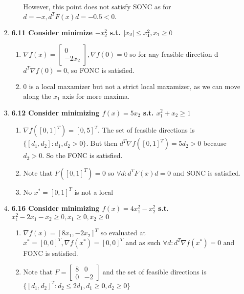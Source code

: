 \documentclass[10pt,a4paper]{article}
\DeclarePairedDelimiter{\abs}{\lvert}{\rvert}
\begin{document}
\begin{enumerate}
\begin{enumerate}
        However, this point does not satisfy SONC as for $d = -x, d^TF(x)d = -0.5 < 0$.
    \end{enumerate}

    \item \textbf{6.11 Consider minimize $-x_2^2$ s.t. $\abs{x_2} \leq x_1^2, x_1 \geq 0$}
    \begin{enumerate}
        \item $\nabla f(x) = \begin{bmatrix} 0 \\ -2x_2 \end{bmatrix}, \nabla f(0) = 0$ so for any feasible direction d $d^T \nabla f(0) = 0$, so FONC is satisfied. 
        \item 0 is a local maxamizer but not a strict local maxamizer, as we can move along the $x_1$ axis for more maxima.
    \end{enumerate}

    \item \textbf{6.12 Consider minimizing $f(x) = 5x_2$ s.t. $x_1^2 + x_2 \geq 1$}
    \begin{enumerate}
        \item $\nabla f([0, 1]^T) = [0, 5]^T$. The set of feasible directions  is $ \{ [d_1, d_2] : d_1, d_2 > 0 \}$.
        But then $d^T\nabla f([0,1]^T) = 5d_2 > 0 $ because $d_2 > 0$. So the FONC is satisfied.

        \item Note that $F([0, 1]^T) = 0$ so $\forall d : d^T F(x) d = 0$ and SONC is satisfied.
        \item No $x^* = [0, 1]^T$ is not a local
    \end{enumerate}

    \item \textbf{6.16 Consider minimizing $f(x) = 4x_1^2 - x_2^2$ s.t. $x_1^2 - 2x_1 - x_2 \geq 0, x_1 \geq 0, x_2 \geq 0$}
    \begin{enumerate}
        \item $\nabla f(x) = [8x_1, -2x_2]^T $ so evaluated at $x^* = [0, 0]^T, \nabla f(x^*) = [0,0]^T$ and as such $\forall d : d^T \nabla f(x^*) = 0$ and FONC is satisfied.
        \item Note that $F = \begin{bmatrix} 8 & 0 \\ 0 & -2 \end{bmatrix}$ and the set of feasible directions is  $\{ [d_1, d_2]^T : d_2 \leq 2d_1, d_1 \geq 0, d_2 \geq 0 \}$
        

\end{enumerate}
\end{enumerate}
\end{document}
